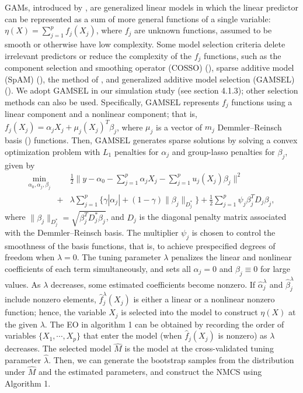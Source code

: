 \documentclass[12pt]{article} %
\theoremstyle{definition}
\begin{document}
GAMs, introduced by \citet{Hastie1986}, are generalized linear models in which the linear predictor can be represented as a sum of more general functions of a single variable: $\eta(X)=\sum_{j=1}^pf_j(X_j)$, where $f_j$ are unknown functions, assumed to be smooth or otherwise have low complexity. Some model selection criteria delete irrelevant predictors or reduce the complexity of the $f_j$ functions, such as the component selection and smoothing operator (COSSO) (\citet{Lin2006}), sparse additive model (SpAM) (\citet{Ravikumar2009}), the method of \citet{Meier2009}, and generalized additive model selection (GAMSEL)
(\citet{Chouldechova2015}). We adopt GAMSEL in our simulation study (see section 4.1.3); other selection methods can also be used. Specifically, GAMSEL represents $f_j$ functions using a linear component and a nonlinear component; that is,
$f_j(X_j)=\alpha_j X_j+\mu_j(X_j)^{T}\beta_j$,
where $\mu_j$ is a vector of $m_j$ Demmler–Reinsch basis (\citet{Demmler1975}) functions. Then, GAMSEL generates sparse solutions by solving a convex optimization problem with $L_1$ penalties for $\alpha_j$ and group-lasso penalties for $\beta_j$, given by
\begin{eqnarray}
\min_{\alpha_0,{\alpha_j},{\beta_j}}&&\frac{1}{2}\Big\|y-\alpha_0-\sum_{j=1}^p\alpha_j X_j-\sum_{j=1}^pu_j(X_j)\beta_j\Big\|^2\nonumber\\
&+&\lambda\sum_{j=1}^p\{\gamma|\alpha_j|+(1-\gamma)\|\beta_j\|_{D_j^*}\}
+\frac{1}{2}\sum_{j=1}^p\psi_j\beta_j^TD_j\beta_j,\label{gamsel}
\end{eqnarray}
where $\|\beta_j\|_{D_j^*}=\sqrt{\beta_j^TD_j^*\beta_j}$, and $D_j$ is the diagonal penalty matrix associated with the Demmler–Reinsch basis. The multiplier $\psi_j$ is chosen to control the smoothness of the basis functions, that is, to achieve prespecified degrees of freedom when $\lambda=0$. The tuning parameter $\lambda$ penalizes the linear and nonlinear coefficients of each term simultaneously, and sets all $\alpha_j=0$ and $\beta_j \equiv 0$ for large values. As $\lambda$ decreases, some estimated coefficients become nonzero. If $\hat{\alpha}_j^{\lambda}$ and $\hat{\beta}_j^{\lambda}$ include nonzero elements, $\hat{f}^{\lambda}_j(X_j)$ is either a linear or a nonlinear nonzero function; hence, the variable $X_j$ is selected into the model to construct $\eta(X)$ at the given $\lambda$. The EO in algorithm 1 can be obtained by recording the order of variables $\{X_1, \cdots, X_p\}$ that enter the model (when $\hat{f}_j(X_j)$ is nonzero) as $\lambda$ decreases. The selected model $\hat{M}$ is the model at the cross-validated tuning parameter $\hat{\lambda}$. Then, we can generate the bootstrap samples from the distribution under $\hat{M}$ and the estimated parameters, and construct the NMCS using Algorithm 1. 
\end{document}
